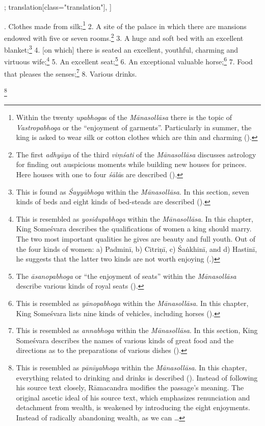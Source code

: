 \begin{alignment}[
  texts=edition[class="edition"];
  translation[class="translation"],
]
\begin{edition}
\begin{prose}[p22_05]
{        }\dd{}
   \end{prose}
\end{edition}
\begin{translation}
    \begin{tlate}[p22_04]
      . Clothes made from silk;\footnote{Within the twenty \textit{upabhoga}s of the \textit{Mānasollāsa} there is the topic of \textit{Vastropabhoga} or the ``enjoyment of garments''. Particularly in summer, the king is asked to wear silk or cotton clothes which are thin and charming (\citeauthor[1939:14]{manasollasa}).} 2. A site of the palace in which there are mansions endowed with five or seven rooms.\footnote{The first \textit{adhyāya} of the third \textit{viṃśati} of the \textit{Mānasollāsa} discusses astrology for finding out auspicious moments while building new houses for princes. Here houses with one to four \textit{śālā}s are described (\citeauthor[1939:6-7]{manasollasa}).} 3. A huge and soft bed with an excellent blanket;\footnote{This is found as \textit{Śayyābhoga} within the \textit{Mānasollāsa}. In this section, seven kinds of beds and eight kinds of bed-steads are described (\citeauthor[1939:21]{manasollasa}).} 4. [on which] there is seated an excellent, youthful, charming and virtuous wife;\footnote{This is resembled as \textit{yosidupabhoga} within the \textit{Mānasollāsa}. In this chapter, King Someśvara describes the qualifications of women a king should marry. The two most important qualities he gives are beauty and full youth. Out of the four kinds of women: a) Padminī, b) Citriṇī, c) Śaṅkhinī, and d) Hastinī, he suggests that the latter two kinds are not worth enjoying  (\citeauthor[21]{manasollasa}.)} 5. An excellent seat;\footnote{The \textit{āsanopabhoga} or ``the enjoyment of seats'' within the \textit{Mānasollāsa} describe various kinds of royal seats (\citeauthor[1939:15]{manasollasa}).} 6. An exceptional valuable horse;\footnote{This is resembled as \textit{yānopabhoga} within the \textit{Mānasollāsa}. In this chapter, King Someśvara lists nine kinds of vehicles, including horses (\citeauthor[1939:24]{manasollasa}).} 7. Food that pleases the senses;\footnote{This is resembled as \textit{annabhoga} within the \textit{Mānasollāsa}. In this section, King Someśvara describes the names of various kinds of great food and the directions as to the preparations of various dishes (\citeauthor[1939:21]{manasollasa}).} 8. Various drinks.\begin{buber}[f22_1]\footnote{This is resembled as \textit{pānīyabhoga} within the \textit{Mānasollāsa}. In this chapter, everything related to drinking and drinks is described (\citeauthor[1939:23]{manasollasa}). Instead of following his source text closely, Rāmacandra modifies the passage's meaning. The original ascetic ideal of his source text, which emphasizes renunciation and detachment from wealth, is weakened by introducing the eight enjoyments. Instead of radically abandoning wealth, as we can \ldots}\end{buber} 

\end{tlate}
\end{translation}
\end{alignment}

